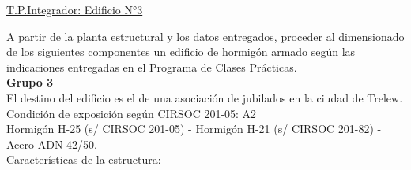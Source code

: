 \begin{center}
\underline{\Large{T.P.Integrador: Edificio N°3}}
\end{center}

A partir de la planta estructural y los datos entregados, proceder al dimensionado de los siguientes
componentes un edificio de hormigón armado según las indicaciones entregadas en el Programa de
Clases Prácticas.\\
\textbf{Grupo 3}\\
El destino del edificio es el de una asociación de jubilados en la ciudad de Trelew.\\
Condición de exposición según CIRSOC 201-05: A2\\
Hormigón H-25 (s/ CIRSOC 201-05) - Hormigón H-21 (s/ CIRSOC 201-82) - Acero ADN 42/50.\\
Características de la estructura:\\
